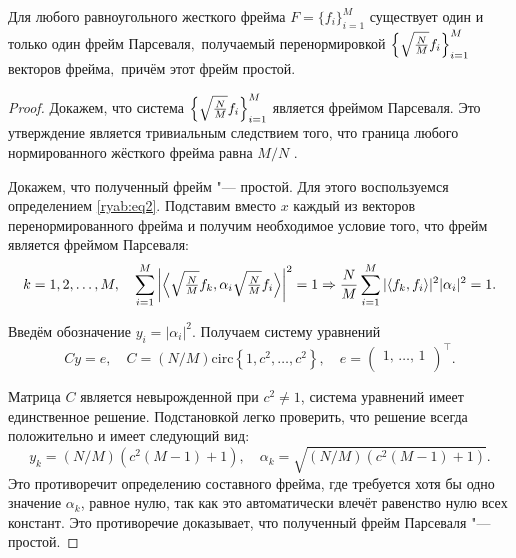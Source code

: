 \begin{theorem}
Для любого равноугольного жесткого фрейма $F = \{f_i\}_{i=1}^M$ существует один и только один фрейм Парсеваля$,$
получаемый перенормировкой $\Bigl\{\sqrt{\frac{N}{M}} f_i \Bigr\}_{i=1}^M$ векторов фрейма$,$ причём этот фрейм простой.
\end{theorem}

\begin{proof}
Докажем, что система $\Bigl\{\sqrt{\frac{N}{M}} f_i \Bigr\}_{i=1}^M$ является фреймом Парсеваля.
Это утверждение является тривиальным следствием того, что граница любого нормированного жёсткого фрейма равна ${M}/{N}$ \cite{ryabtsov:Cas}.

Докажем, что полученный фрейм "--- простой. Для этого воспользуемся определением \eqref{ryab:eq2}.
Подставим вместо $x$ каждый из векторов перенормированного фрейма и получим необходимое
условие того, что фрейм является фреймом Парсеваля:
$$
k = 1, 2, \dots, M, \quad
\sum\limits_{i=1}^M \left|\Bigl\langle \sqrt{\tfrac{N}{M}} f_k, \alpha_i \sqrt{\tfrac{N}{M}} f_i\Bigr \rangle\right|^2 = 1
\Rightarrow 
\frac{N}{M}\sum\limits_{i=1}^M |\langle f_k, f_i \rangle|^2 |\alpha_i|^2 = 1.
$$

Введём обозначение $y_i = |\alpha_i|^2$. Получаем систему уравнений
$$
Cy = e,  \quad C = ({N}/{M}) \text{circ} \left\{1, c^2, \ldots, c^2\right\}, \quad
e =
\begin{pmatrix}
1, \, \ldots, \, 1 \\
\end{pmatrix}^{\top}.
$$

Матрица $C$ является невырожденной при $c^2 \neq 1$, система уравнений имеет единственное решение.
Подстановкой легко проверить, что решение всегда положительно и имеет следующий вид:
$$
y_k = (N / M) \left(c^2 (M - 1) + 1 \right), \quad
\alpha_k = \sqrt{ (N  /  M) \left(c^2 (M - 1) + 1 \right)}.
$$
Это противоречит определению составного фрейма, где требуется хотя бы одно значение $\alpha_k$, равное нулю, так как
это автоматически влечёт равенство нулю всех констант. Это противоречие доказывает, что полученный фрейм Парсеваля "--- простой.
\end{proof}

